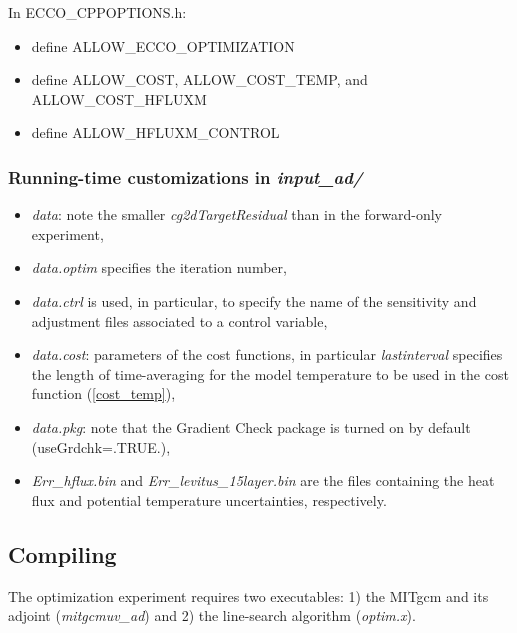 In ECCO\_CPPOPTIONS.h:

\begin{itemize}
\item define ALLOW\_ECCO\_OPTIMIZATION 

\item define ALLOW\_COST, ALLOW\_COST\_TEMP, and ALLOW\_COST\_HFLUXM

\item define ALLOW\_HFLUXM\_CONTROL
\end{itemize}

\subsubsection{Running-time customizations in {\it input\_ad/}}\label{sectRun}

\begin{itemize}

\item {\it data}: note the smaller {\it cg2dTargetResidual} than in the
forward-only experiment,

\item {\it data.optim} specifies the iteration number,

\item {\it data.ctrl} is used, in particular, to specify the
name of the sensitivity and adjustment files associated to a control
variable,

\item {\it data.cost}: parameters of the cost functions, in particular
{\it lastinterval} specifies the length of time-averaging for the model
temperature to be used in the cost function (\ref{cost_temp}),

\item {\it data.pkg}: note that the Gradient Check package is turned on by
default (useGrdchk=.TRUE.),

\item {\it Err\_hflux.bin} and {\it Err\_levitus\_15layer.bin} are the
files containing the heat flux and potential temperature uncertainties,
respectively.

\end{itemize}

\subsection{Compiling} 

The optimization experiment requires two executables: 1) the 
MITgcm and its adjoint ({\it mitgcmuv\_ad}) and 2) the line-search
algorithm ({\it optim.x}).

